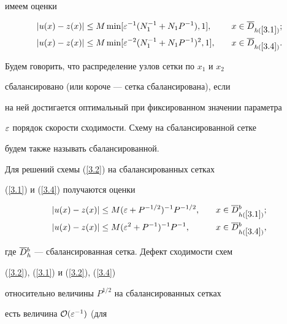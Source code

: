 имеем оценки


\begin{alignat*}{2}


|u(x)-z(x)|&\le M\min[\eps^{-1}(N_1^{-1}+


N_1P^{-1}), 1], &\quad x&\in\Db_{h(\ref{3.1})};\\


%


|u(x)-z(x)|&\le M\min[\eps^{-2}(N_1^{-1}+


N_1P^{-1})^2, 1], &\quad x&\in\Db_{h(\ref{3.4})}.


\end{alignat*}





Будем говорить, что распределение узлов сетки по $x_1$ и $x_2$


сбалансировано (или короче --- сетка сбалансирована), если


на ней достигается оптимальный при фиксированном значении параметра


$\varepsilon$ порядок скорости сходимости. Схему на сбалансированной сетке


будем также называть сбалансированной.





Для решений схемы (\ref{3.2}) на сбалансированных сетках


(\ref{3.1}) и (\ref{3.4}) получаются оценки


\begin{alignat}{2}


\label{4.1}


|u(x)-z(x)|&\le M(\eps+P^{-1/2})^{-1}


P^{-1/2}, &\quad x&\in\Db{}^{b}_{h(\ref{3.1})}; \\


%


\label{4.2}


|u(x)-z(x)|&\le M(\eps^2+P^{-1})^{-1}


P^{-1}, &\quad x&\in\Db{}^{b}_{h(\ref{3.4})},


\end{alignat}


где $\overline{D}{}_h^{b}$ --- сбалансированная сетка. Дефект сходимости схем


(\ref{3.2}), (\ref{3.1}) и (\ref{3.2}), (\ref{3.4})


относительно величины $P^{1/2}$ на сбалансированных сетках


есть величина ${\cal O} (\varepsilon^{-1})$ (для


